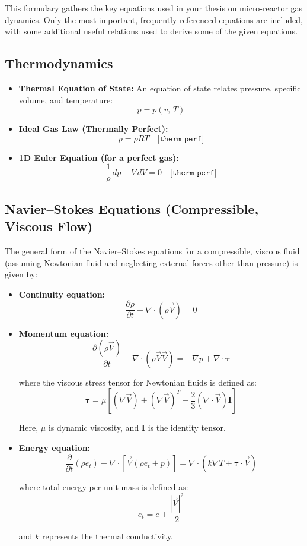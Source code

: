 This formulary gathers the key equations used in your thesis on micro-reactor gas dynamics.
Only the most important, frequently referenced equations are included, with some additional useful relations used to derive some of the given equations.

\subsection*{Thermodynamics}
\begin{itemize}
    \item \textbf{Thermal Equation of State:}  
    An equation of state relates pressure, specific volume, and temperature:
    $$
	    p = p(v,\,T)
    $$
    \item \textbf{Ideal Gas Law (Thermally Perfect):}  
    $$
	    p = \rho R T \quad \texttt{[therm perf]}
    $$
    \item \textbf{1D Euler Equation (for a perfect gas):}  
    $$
	    \frac{1}{\rho}\,dp + V\,dV = 0 \quad \texttt{[therm perf]}
    $$
\end{itemize}

\subsection*{Navier–Stokes Equations (Compressible, Viscous Flow)}
The general form of the Navier–Stokes equations for a compressible, viscous fluid (assuming Newtonian fluid and neglecting external forces other than pressure) is given by:

\begin{itemize}
    \item \textbf{Continuity equation:}
    $$
        \frac{\partial \rho}{\partial t} + \nabla\cdot(\rho \vec{V}) = 0
    $$

    \item \textbf{Momentum equation:}
    $$
        \frac{\partial (\rho \vec{V})}{\partial t} + \nabla\cdot(\rho \vec{V}\vec{V}) 
        = -\nabla p + \nabla\cdot \boldsymbol{\tau}
    $$

    where the viscous stress tensor for Newtonian fluids is defined as:
    $$
        \boldsymbol{\tau} = \mu\left[ (\nabla \vec{V}) + (\nabla \vec{V})^T - \frac{2}{3}(\nabla\cdot \vec{V})\boldsymbol{I}\right]
    $$

    Here, $\mu$ is dynamic viscosity, and $\boldsymbol{I}$ is the identity tensor.

    \item \textbf{Energy equation:}
    $$
        \frac{\partial}{\partial t}\left(\rho e_t\right) 
        + \nabla \cdot \left[\vec{V}\left(\rho e_t + p\right)\right]
        = \nabla \cdot \left( k\nabla T + \boldsymbol{\tau}\cdot\vec{V} \right)
    $$

    where total energy per unit mass is defined as:
    $$
        e_t = e + \frac{|\vec{V}|^2}{2}
    $$

    and $k$ represents the thermal conductivity.
\end{itemize}

